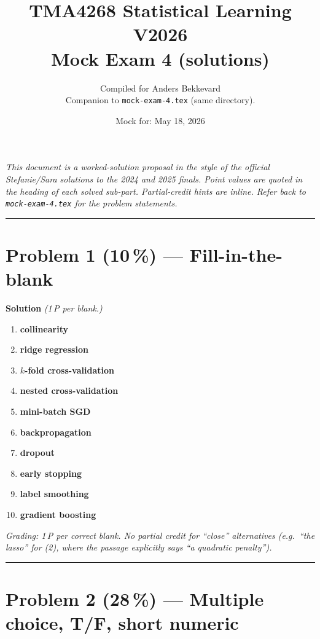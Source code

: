\documentclass[11pt,a4paper]{article}
\title{TMA4268 Statistical Learning V2026\\[0.3em]
\large Mock Exam 4 (solutions)}
\author{Compiled for Anders Bekkevard\\[0.2em]
\small Companion to \texttt{mock-exam-4.tex} (same directory).}
\date{Mock for: May 18, 2026}
\newcommand{\points}[1]{\textbf{(#1\,\%)}}
\newcommand{\sol}{\noindent\textbf{Solution}}
\begin{document}
\maketitle

\noindent\textit{This document is a worked-solution proposal in the style of the official
Stefanie/Sara solutions to the 2024 and 2025 finals. Point values are quoted in the
heading of each solved sub-part. Partial-credit hints are inline. Refer back to
\texttt{mock-exam-4.tex} for the problem statements.}

\vspace{0.6em}
\hrule
\vspace{1em}

\section*{Problem 1 \points{10} --- Fill-in-the-blank}

\sol{} \emph{(1\,P per blank.)}

\begin{enumerate}[(1)]
  \item \textbf{collinearity}
  \item \textbf{ridge regression}
  \item \textbf{$k$-fold cross-validation}
  \item \textbf{nested cross-validation}
  \item \textbf{mini-batch SGD}
  \item \textbf{backpropagation}
  \item \textbf{dropout}
  \item \textbf{early stopping}
  \item \textbf{label smoothing}
  \item \textbf{gradient boosting}
\end{enumerate}

\noindent\emph{Grading: 1\,P per correct blank. No partial credit for ``close'' alternatives
(e.g.\ ``the lasso'' for (2), where the passage explicitly says ``a quadratic penalty'').}

\vspace{0.6em}
\hrule
\vspace{1em}

\section*{Problem 2 \points{28} --- Multiple choice, T/F, short numeric}
\end{document}
